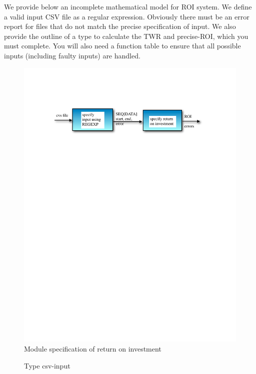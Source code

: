 \documentclass[runningheads,12pt]{article}
\begin{document}
{\color{red} We provide below an incomplete mathematical model for ROI system. We define a valid input CSV file as a regular expression. Obviously there must be an error report for files that do not match the precise specification of input. We also provide the outline of a type to calculate the TWR and precise-ROI, which you must complete. You will also need a function table to ensure that all possible inputs (including faulty inputs) are handled.}

\begin{figure}
\centering
\includegraphics[scale=0.8]{inputs/spec.pdf}

\caption{Module specification of return on investment}
\end{figure}

\begin{figure}

\caption{Type csv-input}
\label{fig:input}
\end{figure}


	
\end{document}
